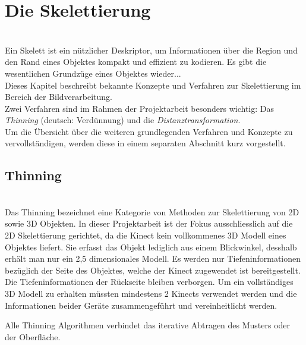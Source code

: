 \chapter{Die Skelettierung}
\\
Ein Skelett ist ein nützlicher Deskriptor, um Informationen über die Region und den Rand eines Objektes kompakt und effizient
zu kodieren. Es gibt die wesentlichen Grundzüge eines Objektes wieder...\\
Dieses Kapitel beschreibt bekannte Konzepte und Verfahren zur Skelettierung im Bereich der Bildverarbeitung.\\
Zwei Verfahren sind im Rahmen der Projektarbeit besonders wichtig: Das \emph{Thinning} (deutsch: Verdünnung) und die \emph{Distanztransformation}. \\
Um die Übersicht über die weiteren grundlegenden Verfahren und Konzepte zu vervollständigen, werden diese in einem separaten 
Abschnitt kurz vorgestellt.
\section{Thinning}
\\
Das Thinning bezeichnet eine Kategorie von Methoden zur Skelettierung von 2D sowie 3D Objekten. In dieser Projektarbeit ist der Fokus ausschliesslich auf die 2D Skelettierung gerichtet, da die Kinect kein vollkommenes 3D Modell eines Objektes liefert. Sie erfasst das Objekt lediglich aus einem Blickwinkel, desshalb erhält man nur ein 2,5 dimensionales Modell. Es werden nur Tiefeninformationen bezüglich der Seite des Objektes, welche der Kinect zugewendet ist bereitgestellt. Die  Tiefeninformationen der Rückseite bleiben verborgen. Um ein vollständiges 3D Modell zu erhalten müssten mindestens 2 Kinects verwendet werden und die Informationen beider Geräte zusammengeführt und vereinheitlicht werden. 

Alle Thinning Algorithmen verbindet das iterative Abtragen des Musters oder der Oberfläche.

